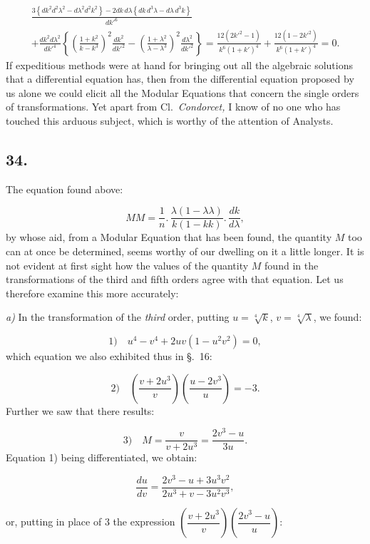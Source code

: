 \documentclass{article}
\begin{document}
\[
\begin{gathered}
\frac{3\left\{dk^{2}d^{2}\lambda^{2}-d\lambda^{2}d^{2}k^{2}\right\}-2dk\,d\lambda\left\{dk\,d^{3}\lambda-d\lambda\,d^{3}k\right\}}{dk'^{6}}\\[1.5ex]
+\frac{dk^{2}d\lambda^{2}}{dk'^{4}}\left\{\left(\frac{1+k^{2}}{k-k^{3}}\right)^{2}\frac{dk^{2}}{dk'^{2}}-\left(\frac{1+\lambda^{2}}{\lambda-\lambda^{3}}\right)^{2}\frac{d\lambda^{2}}{dk'^{2}}\right\}=\frac{12(2k'^{2}-1)}{k^{6}(1+k')^{4}}+\frac{12(1-2k'^{2})}{k^{6}(1+k')^{4}}=0.
\end{gathered}
\]
If expeditious methods were at hand for bringing out all the algebraic solutions that a differential equation has, then from the differential equation proposed by us alone we could elicit all the Modular Equations that concern the single orders of transformations. Yet apart from Cl.\ \emph{Condorcet,} I know of no one who has touched this arduous subject, which is worthy of the attention of Analysts.

\subsection*{34.}

The equation found above:

\[
MM=\frac{1}{n}.\,\frac{\lambda(1-\lambda\lambda)}{k(1-kk)}.\,\frac{dk}{d\lambda},
\]
by whose aid, from a Modular Equation that has been found, the quantity $M$ too can at once be determined, seems worthy of our dwelling on it a little longer. It is not evident at first sight how the values of the quantity $M$ found in the transformations of the third and fifth orders agree with that equation. Let us therefore examine this more accurately:

\emph{a)} In the transformation of the \emph{third} order, putting $u=\sqrt[4]{k}$, $v=\sqrt[4]{\lambda}$, we found:

\[
\text{1)}\quad u^{4}-v^{4}+2uv(1-u^{2}v^{2})=0,
\]
which equation we also exhibited thus in §.\ 16:

\[
\text{2)}\quad\left(\frac{v+2u^{3}}{v}\right)\left(\frac{u-2v^{3}}{u}\right)=-3.
\]
Further we saw that there results:

\[
\text{3)}\quad M=\frac{v}{v+2u^{3}}=\frac{2v^{3}-u}{3u}.
\]
Equation 1) being differentiated, we obtain:

\[
\frac{du}{dv}=\frac{2v^{3}-u+3u^{3}v^{2}}{2u^{3}+v-3u^{2}v^{3}},
\]

or, putting in place of $3$ the expression $\left(\dfrac{v+2u^{3}}{v}\right)\left(\dfrac{2v^{3}-u}{u}\right)$:
\end{document}
